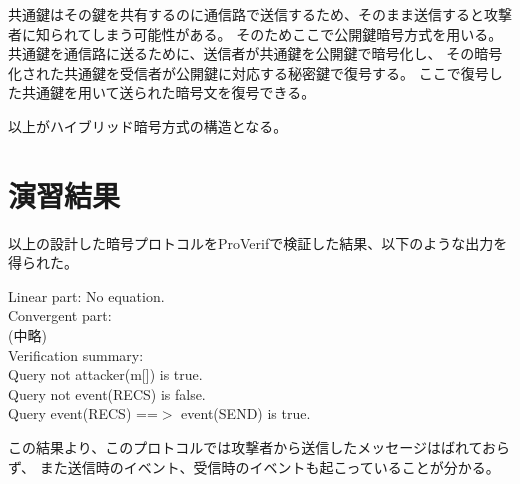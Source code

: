 \documentclass[a4paper,11pt,titlepage,dvipdfmx]{jsarticle}
\begin{document}
共通鍵はその鍵を共有するのに通信路で送信するため、そのまま送信すると攻撃者に知られてしまう可能性がある。
そのためここで公開鍵暗号方式を用いる。共通鍵を通信路に送るために、送信者が共通鍵を公開鍵で暗号化し、
その暗号化された共通鍵を受信者が公開鍵に対応する秘密鍵で復号する。
ここで復号した共通鍵を用いて送られた暗号文を復号できる。

以上がハイブリッド暗号方式の構造となる。

\section{演習結果}
以上の設計した暗号プロトコルをProVerifで検証した結果、以下のような出力を得られた。
\begin{shaded}
    \noindent
    Linear part: No equation.\\
    Convergent part:\\
    (中略)\\
    Verification summary:\\
    Query not attacker(m[]) is true.\\
    Query not event(RECS) is false.\\
    Query event(RECS) ==$>$ event(SEND) is true.
\end{shaded}

この結果より、このプロトコルでは攻撃者から送信したメッセージはばれておらず、
また送信時のイベント、受信時のイベントも起こっていることが分かる。
\end{document}
